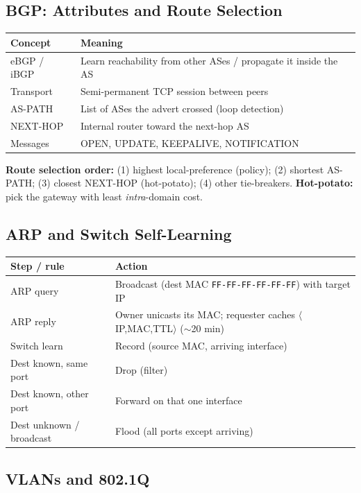 \documentclass[hidelinks]{article}
\begin{document}
\subsection{BGP: Attributes and Route Selection}

\noindent\begin{tabularx}{\textwidth}{|l|X|}
\hline
\textbf{Concept} & \textbf{Meaning} \\
\hline
eBGP / iBGP & Learn reachability from other ASes / propagate it inside the AS \\
\hline
Transport & Semi-permanent TCP session between peers \\
\hline
AS-PATH & List of ASes the advert crossed (loop detection) \\
\hline
NEXT-HOP & Internal router toward the next-hop AS \\
\hline
Messages & OPEN, UPDATE, KEEPALIVE, NOTIFICATION \\
\hline
\end{tabularx}

\medskip
\noindent\textbf{Route selection order:} (1) highest local-preference (policy);
(2) shortest AS-PATH; (3) closest NEXT-HOP (hot-potato); (4) other tie-breakers.
\textbf{Hot-potato:} pick the gateway with least \emph{intra}-domain cost.

\subsection{ARP and Switch Self-Learning}

\noindent\begin{tabularx}{\textwidth}{|l|X|}
\hline
\textbf{Step / rule} & \textbf{Action} \\
\hline
ARP query & Broadcast (dest MAC \texttt{FF-FF-FF-FF-FF-FF}) with target IP \\
\hline
ARP reply & Owner unicasts its MAC; requester caches $\langle$IP,MAC,TTL$\rangle$ ($\sim$20 min) \\
\hline
Switch learn & Record (source MAC, arriving interface) \\
\hline
Dest known, same port & Drop (filter) \\
\hline
Dest known, other port & Forward on that one interface \\
\hline
Dest unknown / broadcast & Flood (all ports except arriving) \\
\hline
\end{tabularx}

\subsection{VLANs and 802.1Q}
\end{document}
